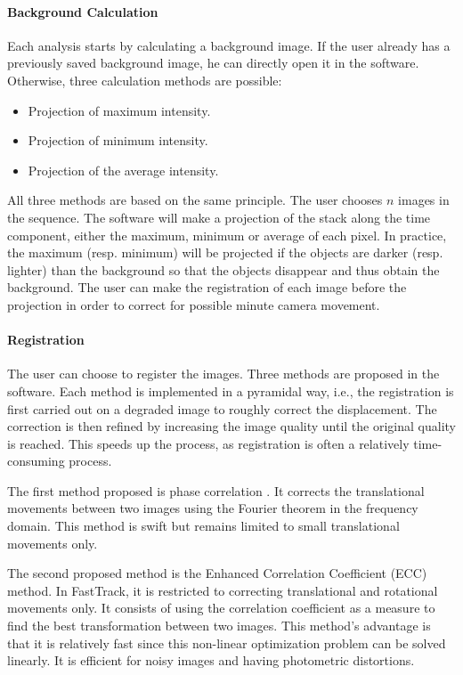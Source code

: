     \paragraph{Background Calculation}
    Each analysis starts by calculating a background image. If the user already has a previously saved background image, he can directly open it in the software. Otherwise, three calculation methods are possible:
    \begin{itemize}
        \item Projection of maximum intensity.
        \item Projection of minimum intensity.
        \item Projection of the average intensity.
    \end{itemize}
    All three methods are based on the same principle. The user chooses $n$ images in the sequence. The software will make a projection of the stack along the time component, either the maximum, minimum or average of each pixel. In practice, the maximum (resp. minimum) will be projected if the objects are darker (resp. lighter) than the background so that the objects disappear and thus obtain the background. The user can make the registration of each image before the projection in order to correct for possible minute camera movement.

    \paragraph{Registration}
    The user can choose to register the images. Three methods are proposed in the software. Each method is implemented in a pyramidal way, i.e., the registration is first carried out on a degraded image to roughly correct the displacement. The correction is then refined by increasing the image quality until the original quality is reached. This speeds up the process, as registration is often a relatively time-consuming process.

    The first method proposed is phase correlation \cite{stone2001fast}. It corrects the translational movements between two images using the Fourier theorem in the frequency domain. This method is swift but remains limited to small translational movements only.

    The second proposed method is the Enhanced Correlation Coefficient (ECC) \cite{evangelidis2008parametric} method. In FastTrack, it is restricted to correcting translational and rotational movements only. It consists of using the correlation coefficient as a measure to find the best transformation between two images. This method's advantage is that it is relatively fast since this non-linear optimization problem can be solved linearly. It is efficient for noisy images and having photometric distortions.

